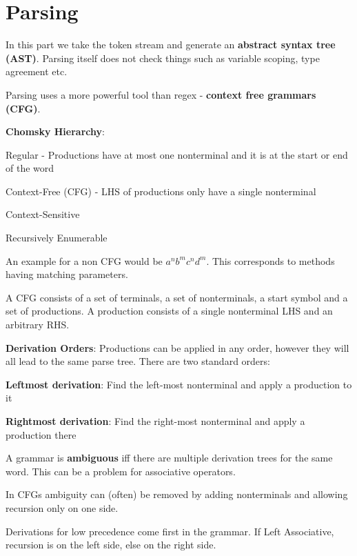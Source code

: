 \section*{Parsing}

In this part we take the token stream and generate an \textbf{abstract syntax tree (AST)}. Parsing itself does not check things such as variable scoping, type agreement etc. \medskip

Parsing uses a more powerful tool than regex - \textbf{context free grammars (CFG)}. \medskip

\textbf{Chomsky Hierarchy}:
\begin{compactitem}[$\quad\bullet$]
	\item Regular - Productions have at most one nonterminal and it is at the start or end of the word
	\item Context-Free (CFG) - LHS of productions only have a single nonterminal
	\item Context-Sensitive
	\item Recursively Enumerable
\end{compactitem}

An example for a non CFG would be $a^n b^m c^n d^m$. This corresponds to methods having matching parameters.\medskip

A CFG consists of a set of terminals, a set of nonterminals, a start symbol and a set of productions. A production consists of a single nonterminal LHS and an arbitrary RHS. \medskip

\textbf{Derivation Orders}: Productions can be applied in any order, however they will all lead to the same parse tree. There are two standard orders:
\begin{compactitem}[$\quad\bullet$]
	\item \textbf{Leftmost derivation}: Find the left-most nonterminal and apply a production to it
	\item \textbf{Rightmost derivation}: Find the right-most nonterminal and apply a production there
\end{compactitem}

A grammar is \textbf{ambiguous} iff there are multiple derivation trees for the same word. This can be a problem for associative operators. \medskip

In CFGs ambiguity can (often) be removed by adding nonterminals and allowing recursion only on one side. \smallskip

Derivations for low precedence come first in the grammar. If Left Associative, recursion is on the left side, else on the right side.  \smallskip

